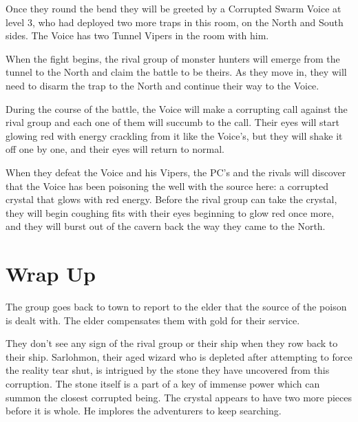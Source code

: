 \begin{multicols}{2}
  Once they round the bend they will be greeted by a Corrupted Swarm Voice at level 3, who had deployed two more traps in this room, on the North and South sides. The Voice has two Tunnel Vipers in the room with him.

  When the fight begins, the rival group of monster hunters will emerge from the tunnel to the North and claim the battle to be theirs. As they move in, they will need to disarm the trap to the North and continue their way to the Voice.

  During the course of the battle, the Voice will make a corrupting call against the rival group and each one of them will succumb to the call. Their eyes will start glowing red with energy crackling from it like the Voice's, but they will shake it off one by one, and their eyes will return to normal.

  When they defeat the Voice and his Vipers, the PC's and the rivals will discover that the Voice has been poisoning the well with the source here: a corrupted crystal that glows with red energy. Before the rival group can take the crystal, they will begin coughing fits with their eyes beginning to glow red once more, and they will burst out of the cavern back the way they came to the North.

  \section{Wrap Up}
  The group goes back to town to report to the elder that the source of the poison is dealt with. The elder compensates them with gold for their service.

  They don't see any sign of the rival group or their ship when they row back to their ship. Sarlohmon, their aged wizard who is depleted after attempting to force the reality tear shut, is intrigued by the stone they have uncovered from this corruption. The stone itself is a part of a key of immense power which can summon the closest corrupted being. The crystal appears to have two more pieces before it is whole. He implores the adventurers to keep searching.

\end{multicols}